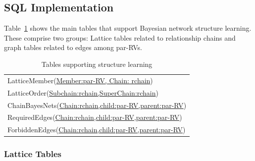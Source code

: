 \subsection{SQL Implementation}

Table~\ref{table:laj-tables} shows the main tables that support Bayesian network structure learning. These comprise two groups: Lattice tables related to relationship chains and graph tables related to edges among par-RVs.  


\begin{table}[tbp]
\caption{Tables supporting structure learning}
 \centering
 \begin{tabular}
[c]{|l|}\hline
LatticeMember(\underline{Member:par-RV, Chain: rchain})\\
LatticeOrder(\underline{Subchain:rchain,SuperChain:rchain})\\
ChainBayesNets(\underline{Chain:rchain,child:par-RV,parent:par-RV})\\
RequiredEdges(\underline{Chain:rchain,child:par-RV,parent:par-RV})\\
ForbiddenEdges(\underline{Chain:rchain,child:par-RV,parent:par-RV})\\
\hline
\end{tabular}
\label{table:laj-tables}
\end{table}
 

\subsubsection{Lattice Tables}


\begin{table}[htdp]
\begin{center}
\end{center}
\label{table:lattice-tables}
\end{table}%

